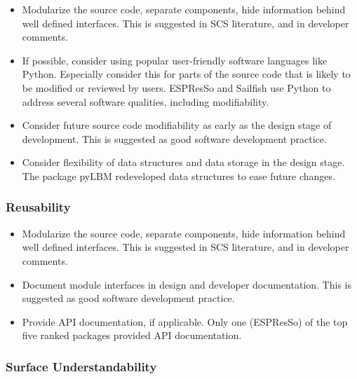 \documentclass[final, 3p, times, authoryear]{elsarticle}
\begin{document}
\begin{itemize}
	\item Modularize the source code, separate components, hide information behind well defined interfaces. This is suggested in SCS literature, and in developer comments.
	\item If possible, consider using popular user-friendly software languages like Python. Especially consider this for parts of the source code that is likely to be modified or reviewed by users. ESPResSo and Sailfish use Python to address several software qualities, including modifiability.
	\item Consider future source code modifiability as early as the design stage of development. This is suggested as good software development practice.
	\item Consider flexibility of data structures and data storage in the design stage. The package pyLBM redeveloped data structures to ease future changes.
\end{itemize}

\subsubsection{Reusability}

\begin{itemize}
	\item Modularize the source code, separate components, hide information behind well defined interfaces. This is suggested in SCS literature, and in developer comments.
	\item Document module interfaces in design and developer documentation. This is suggested as good software development practice.
	\item Provide API documentation, if applicable. Only one (ESPResSo) of the top five ranked packages provided API documentation.
\end{itemize}

\subsubsection{Surface Understandability}
\end{document}
